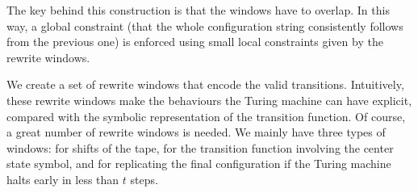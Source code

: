 The key behind this construction is that the windows have to overlap. In this way, a global constraint (that the whole configuration string consistently follows from the previous one) is enforced using small local constraints given by the rewrite windows.

We create a set of rewrite windows that encode the valid transitions. 
Intuitively, these rewrite windows make the behaviours the Turing machine can have explicit, compared with the symbolic representation of the transition function.
Of course, a great number of rewrite windows is needed. We mainly have three types of windows: for shifts of the tape, for the transition function involving the center state symbol, and for replicating the final configuration if the Turing machine halts early in less than $t$ steps.

